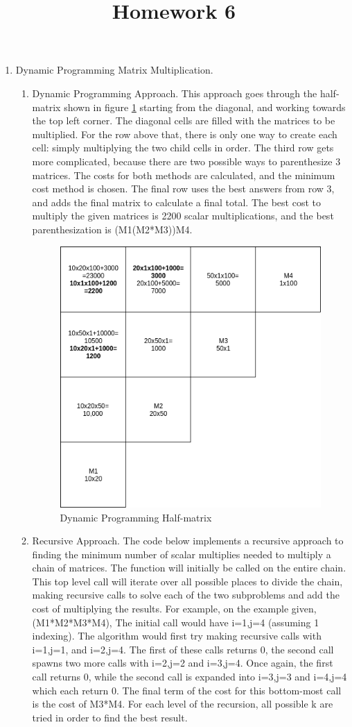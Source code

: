 \documentclass[12pt, letter]{article}
\title{ Homework 6 }
\begin{document}
\maketitle
\thispagestyle{fancy}

\begin{enumerate}
	\item Dynamic Programming Matrix Multiplication. 	
	\begin{enumerate}
		\item Dynamic Programming Approach. This approach goes through the half-matrix shown in figure \ref{fig:hw6} starting from the diagonal, and working towards the top left corner. The diagonal cells are filled with the matrices to be multiplied. For the row above that, there is only one way to create each cell: simply multiplying the two child cells in order. The third row gets more complicated, because there are two possible ways to parenthesize 3 matrices. The costs for both methods are calculated, and the minimum cost method is chosen. The final row uses the best answers from row 3, and adds the final matrix to calculate a final total. The best cost to multiply the given matrices is 2200 scalar multiplications, and the best parenthesization is (M1(M2*M3))M4.
		\begin{figure}[h]
			\centering
			\includegraphics[width=0.6\linewidth]{hw6}
			\caption{Dynamic Programming Half-matrix}
			\label{fig:hw6}
		\end{figure}
		\item Recursive Approach. The code below implements a recursive approach to finding the minimum number of scalar multiplies needed to multiply a chain of matrices. The function will initially be called on the entire chain. This top level call will iterate over all possible places to divide the chain, making recursive calls to solve each of the two subproblems and add the cost of multiplying the results. For example, on the example given, (M1*M2*M3*M4), The initial call would have i=1,j=4 (assuming 1 indexing). The algorithm would first try making recursive calls with i=1,j=1, and i=2,j=4. The first of these calls returns 0, the second call spawns two more calls with i=2,j=2 and i=3,j=4. Once again, the first call returns 0, while the second call is expanded into i=3,j=3 and i=4,j=4 which each return 0. The final term of the cost for this bottom-most call is the cost of M3*M4. For each level of the recursion, all possible k are tried in order to find the best result.

\end{enumerate}
\end{enumerate}
\end{document}
